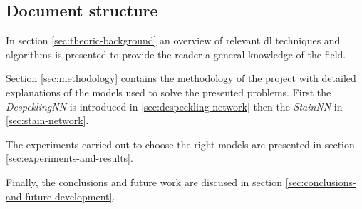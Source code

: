 \documentclass[../main.tex]{subfiles}
\begin{document}

\subsection{Document structure}
In section \ref{sec:theoric-background} an overview of relevant \gls{dl} techniques and algorithms
is presented to provide the reader a general knowledge of the field.

Section \ref{sec:methodology} contains the methodology of the project with detailed
explanations of the models used to solve the presented problems. First the
\emph{DespeklingNN} is introduced in \ref{sec:despeckling-network} then the
\emph{StainNN} in \ref{sec:stain-network}.

The experiments carried out to choose the right models are presented in section
\ref{sec:experiments-and-results}.

Finally, the conclusions and future work are discused in section
\ref{sec:conclusions-and-future-development}.
\end{document}
